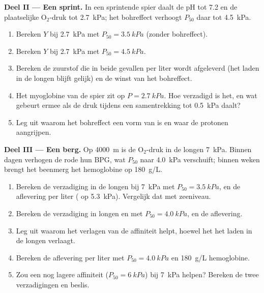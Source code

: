 \begin{problem}
\medskip
\noindent\textbf{Deel II --- Een sprint.}
In een sprintende spier daalt de pH tot 7.2 en de plaatselijke $\mathrm{O_2}$-druk
tot \qty{2.7}{kPa}; het bohreffect verhoogt $P_{50}$ daar tot \qty{4.5}{kPa}.
\begin{enumerate}[resume]
  \item Bereken $Y$ bij \qty{2.7}{kPa} met $P_{50} = \qty{3.5}{kPa}$
        (zonder bohreffect).
  \item Bereken $Y$ bij \qty{2.7}{kPa} met $P_{50} = \qty{4.5}{kPa}$.
  \item Bereken de zuurstof die in beide gevallen per liter wordt
        afgeleverd (het laden in de longen blijft gelijk) en de winst van
        het bohreffect.
  \item Het myoglobine van de spier zit op $P = \qty{2.7}{kPa}$. Hoe
        verzadigd is het, en wat gebeurt ermee als de druk tijdens een
        samentrekking tot \qty{0.5}{kPa} daalt?
  \item Leg uit waarom het bohreffect een vorm van  is en waar de
        protonen aangrijpen.
\end{enumerate}

\medskip
\noindent\textbf{Deel III --- Een berg.}
Op \qty{4000}{m} is de $\mathrm{O_2}$-druk in de longen \qty{7}{kPa}. Binnen dagen
verhogen de rode  hun BPG, wat $P_{50}$ naar \qty{4.0}{kPa} verschuift;
binnen weken brengt het beenmerg het hemoglobine op \qty{180}{g/L}.
\begin{enumerate}[resume]
  \item Bereken de verzadiging in de longen bij \qty{7}{kPa} met
        $P_{50} = \qty{3.5}{kPa}$, en de aflevering per liter ( op
        \qty{5.3}{kPa}). Vergelijk dat met zeeniveau.
  \item Bereken de verzadiging in longen en  met
        $P_{50} = \qty{4.0}{kPa}$, en de aflevering.
  \item Leg uit waarom het verlagen van de affiniteit helpt, hoewel het het
        laden in de longen verlaagt.
  \item Bereken de aflevering per liter met $P_{50} = \qty{4.0}{kPa}$ en
        \qty{180}{g/L} hemoglobine.
  \item Zou een nog lagere affiniteit ($P_{50} = \qty{6}{kPa}$) bij
        \qty{7}{kPa} helpen? Bereken de twee verzadigingen en beslis.
\end{enumerate}


\end{problem}
